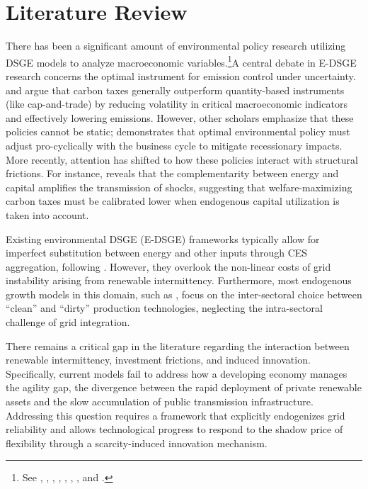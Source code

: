 	\section{Literature Review}
	There has been a significant amount of environmental policy research utilizing DSGE models to analyze macroeconomic variables.\footnote{See \citep{annicchiarico2015}, \citep{dissou2016}, \citep{annicchiarico2017}, \citep{khan2019}, \citep{chan2020a}, \citep{chan2020b}, \citep{lintunen2021}, and \citep{xiao2022}.}A central debate in E-DSGE research concerns the optimal instrument for emission control under uncertainty. \citet{fischer2011} and \citet{bosetti2013} argue that carbon taxes generally outperform quantity-based instruments (like cap-and-trade) by reducing volatility in critical macroeconomic indicators and effectively lowering emissions. However, other scholars emphasize that these policies cannot be static; \citet{heutel2012} demonstrates that optimal environmental policy must adjust pro-cyclically with the business cycle to mitigate recessionary impacts. More recently, attention has shifted to how these policies interact with structural frictions. For instance, \citet{chan2023} reveals that the complementarity between energy and capital amplifies the transmission of shocks, 	suggesting that welfare-maximizing carbon taxes must be calibrated lower when endogenous capital utilization is taken into account.
	
	Existing environmental DSGE (E-DSGE) frameworks typically allow for imperfect substitution between energy and other inputs through CES aggregation, following \citet{heutel2012}. However, they overlook the non-linear costs of grid instability arising from renewable intermittency. Furthermore, most endogenous growth models in this domain, such as \citet{acemoglu2012environment}, focus on the inter-sectoral choice between ``clean'' and ``dirty'' production technologies, neglecting the intra-sectoral challenge of grid integration.
	
	There remains a critical gap in the literature regarding the interaction between renewable intermittency, investment frictions, and induced innovation. Specifically, current models fail to address how a developing economy manages the agility gap, the divergence between the rapid deployment of private renewable assets and the slow accumulation of public transmission infrastructure. Addressing this question requires a framework that explicitly endogenizes grid reliability and allows technological progress to respond to the shadow price of flexibility through a scarcity-induced innovation mechanism.
	
